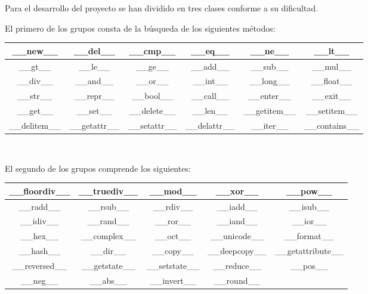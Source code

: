\documentclass[a4paper, 12pt]{book}
\begin{document}
\begin{itemize}
Para el desarrollo del proyecto se han dividido en tres clases conforme a su dificultad.

El primero de los grupos consta de la búsqueda de los siguientes métodos:

\begin{center}
\begin{tabular}{ | c | c | c | c | c | c |}
\hline
\_\_new\_\_ & \_\_del\_\_ & \_\_cmp\_\_ & \_\_eq\_\_ & \_\_ne\_\_ & \_\_lt\_\_ \\
\hline
\_\_gt\_\_ & \_\_le\_\_ & \_\_ge\_\_ & \_\_add\_\_ & \_\_sub\_\_ & \_\_mul\_\_ \\
\hline
\_\_div\_\_ & \_\_and\_\_ & \_\_or\_\_ & \_\_int\_\_ & \_\_long\_\_ & \_\_float\_\_ \\
\hline
\_\_str\_\_ & \_\_repr\_\_ & \_\_bool\_\_ & \_\_call\_\_ & \_\_enter\_\_ & \_\_exit\_\_  \\
\hline
\_\_get\_\_ & \_\_set\_\_ & \_\_delete\_\_ & \_\_len\_\_ & \_\_getitem\_\_ & \_\_setitem\_\_  \\
\hline
\_\_delitem\_\_ & \_\_getattr\_\_ & \_\_setattr\_\_ & \_\_delattr\_\_ & \_\_iter\_\_ & \_\_contains\_\_ \\
\hline
\end{tabular} \\
\end{center}


El segundo de los grupos comprende los siguientes:

\begin{center}
\begin{tabular}{ | c | c | c | c | c |}
\hline
\_\_floordiv\_\_ & \_\_truediv\_\_ & \_\_mod\_\_ & \_\_xor\_\_ & \_\_pow\_\_  \\
\hline
\_\_radd\_\_ & \_\_rsub\_\_ & \_\_rdiv\_\_ & \_\_iadd\_\_ & \_\_isub\_\_  \\
\hline
\_\_idiv\_\_ & \_\_rand\_\_ & \_\_ror\_\_ & \_\_iand\_\_ & \_\_ior\_\_  \\
\hline
\_\_hex\_\_ & \_\_complex\_\_ & \_\_oct\_\_ & \_\_unicode\_\_ & \_\_format\_\_ \\
\hline
\_\_hash\_\_ & \_\_dir\_\_ & \_\_copy\_\_ & \_\_deepcopy\_\_ & \_\_getattribute\_\_  \\
\hline
\_\_reversed\_\_ & \_\_getstate\_\_ & \_\_setstate\_\_ & \_\_reduce\_\_ & \_\_pos\_\_  \\
\hline
\_\_neg\_\_ & \_\_abs\_\_ & \_\_invert\_\_ & \_\_round\_\_ & \\
\hline
\end{tabular} \\
\end{center}


\end{itemize}
\end{document}
